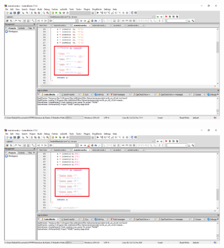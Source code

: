 \begin{figure}[!h]
\centering
\includegraphics[width=6in]{relatorio/imagens/imgTestesRemocaoChar.png}
\end{figure}

\begin{figure}[!h]
\centering
\includegraphics[width=6in]{relatorio/imagens/imgTestesRemocaoInt.png}
\end{figure}